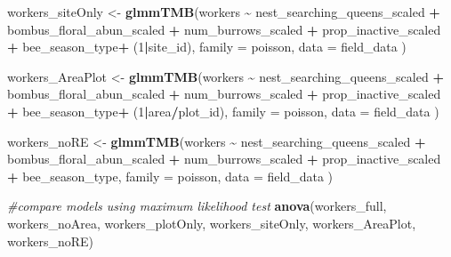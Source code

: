 \documentclass[
]{article}
\newenvironment{Shaded}{\begin{snugshade}}{\end{snugshade}}
\newcommand{\AttributeTok}[1]{\textcolor[rgb]{0.13,0.29,0.53}{#1}}
\newcommand{\CommentTok}[1]{\textcolor[rgb]{0.56,0.35,0.01}{\textit{#1}}}
\newcommand{\DecValTok}[1]{\textcolor[rgb]{0.00,0.00,0.81}{#1}}
\newcommand{\FunctionTok}[1]{\textcolor[rgb]{0.13,0.29,0.53}{\textbf{#1}}}
\newcommand{\NormalTok}[1]{#1}
\newcommand{\OtherTok}[1]{\textcolor[rgb]{0.56,0.35,0.01}{#1}}
\newcommand{\SpecialCharTok}[1]{\textcolor[rgb]{0.81,0.36,0.00}{\textbf{#1}}}
\begin{document}
\begin{Shaded}
\begin{Highlighting}[]
\NormalTok{workers\_siteOnly }\OtherTok{\textless{}{-}} \FunctionTok{glmmTMB}\NormalTok{(workers }\SpecialCharTok{\textasciitilde{}}\NormalTok{ nest\_searching\_queens\_scaled }\SpecialCharTok{+}
\NormalTok{                       bombus\_floral\_abun\_scaled }\SpecialCharTok{+} 
\NormalTok{                       num\_burrows\_scaled }\SpecialCharTok{+} 
\NormalTok{                         prop\_inactive\_scaled }\SpecialCharTok{+}
\NormalTok{                       bee\_season\_type}\SpecialCharTok{+}
\NormalTok{                         (}\DecValTok{1}\SpecialCharTok{|}\NormalTok{site\_id), }
                     \AttributeTok{family =}\NormalTok{ poisson,}
                     \AttributeTok{data =}\NormalTok{ field\_data}
\NormalTok{                       )}

\NormalTok{workers\_AreaPlot }\OtherTok{\textless{}{-}}  \FunctionTok{glmmTMB}\NormalTok{(workers }\SpecialCharTok{\textasciitilde{}}\NormalTok{ nest\_searching\_queens\_scaled }\SpecialCharTok{+}
\NormalTok{                       bombus\_floral\_abun\_scaled }\SpecialCharTok{+} 
\NormalTok{                       num\_burrows\_scaled }\SpecialCharTok{+} 
\NormalTok{                         prop\_inactive\_scaled }\SpecialCharTok{+}
\NormalTok{                       bee\_season\_type}\SpecialCharTok{+}
\NormalTok{                         (}\DecValTok{1}\SpecialCharTok{|}\NormalTok{area}\SpecialCharTok{/}\NormalTok{plot\_id), }
                     \AttributeTok{family =}\NormalTok{ poisson,}
                     \AttributeTok{data =}\NormalTok{ field\_data}
\NormalTok{                       )}

\NormalTok{workers\_noRE }\OtherTok{\textless{}{-}} \FunctionTok{glmmTMB}\NormalTok{(workers }\SpecialCharTok{\textasciitilde{}}\NormalTok{ nest\_searching\_queens\_scaled }\SpecialCharTok{+}
\NormalTok{                       bombus\_floral\_abun\_scaled }\SpecialCharTok{+} 
\NormalTok{                       num\_burrows\_scaled }\SpecialCharTok{+} 
\NormalTok{                         prop\_inactive\_scaled }\SpecialCharTok{+}
\NormalTok{                       bee\_season\_type, }
                     \AttributeTok{family =}\NormalTok{ poisson,}
                     \AttributeTok{data =}\NormalTok{ field\_data}
\NormalTok{                       )}

\CommentTok{\#compare models using maximum likelihood test}
\FunctionTok{anova}\NormalTok{(workers\_full, workers\_noArea, workers\_plotOnly, workers\_siteOnly, workers\_AreaPlot, workers\_noRE)}
\end{Highlighting}
\end{Shaded}
\end{document}
